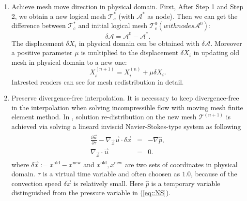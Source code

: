 \documentclass{eajam}
\begin{document}
\begin{enumerate}[step 1]
     \item Achieve mesh move direction in physical domain.
       First, After Step 1 and Step 2, we obtain a new logical mesh
       $\mathcal{T}_c^*$ (with $\mathcal{A}^*$ as node). Then we can get
       the difference between $\mathcal{T}_c^*$ and initial logical mesh
       $\mathcal{T}_c^0(with nodes \mathcal{A}^0)$:
       \begin{equation}
         \delta \mathcal{A} = \mathcal{A}^0 - \mathcal{A}^*.
       \end{equation}
       The displacement $\delta X_i$ in physical domain cen be obtained
       with $\delta \mathcal{A}$. Moreover a positive parameter $\mu$ is multiplied to the 
       displacement $\delta X_i$ in updating old mesh in physical domain
       to a new one: 
       \begin{equation}
         X_i^{(n + 1)} = X_i^{(n)} + \mu \delta X_i.
       \end{equation}
       Intrested readers can see \cite{li2002moving} for mesh
       redistribution in detail.

     \item Preserve divergence-free interpolation.
       It is necessary to keep divergence-free in the interpolation
       when solving incompressible flow with moving mesh finite element
       method. In \cite{di2005moving}, solution re-distribution on the new 
       mesh $\mathcal{T}^{(n + 1)}$ is achieved via solving a lineard inviscid 
       Navier-Stokes-type system as following
       \begin{eqnarray}
         \begin{aligned}
           \frac{\partial \vec{u}}{\partial \tau} - \nabla_{\vec{x}}\vec{u}
           \cdot \delta \vec{x} & = & - \nabla \hat{p}, \\
           \nabla_{\vec{x}}\cdot \vec{u} & = & 0.
         \end{aligned}
         \label{eq::continous_update}
       \end{eqnarray} 
       where $\delta \vec{x} := x^{\text{old}} - x^{\text{new}}$ and 
       $x^{\text{old}}, x^{\text{new}}$ are two sets of coordinates in
       physical domain. $\tau$ is a virtual time variable and often
       choosen as $1.0$, because of the convection speed $\delta \vec{x}$
       is relatively small. Here $\hat{p}$ is a temporary variable
       distinguished from the pressure variable in (\ref{eq::NS}). 


\end{enumerate}
\end{document}
